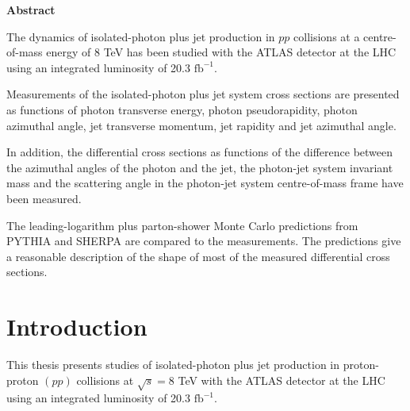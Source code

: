 \documentclass[12pt, twoside]{article}
\numberwithin{equation}{section}
\numberwithin{figure}{section}
\begin{document}
\newpage
\phantom{ }

\newpage
\vspace*{0.4cm}

\begin{center}
    \textbf{Abstract}
\end{center}

\vspace{1.5cm}
The dynamics of isolated-photon plus jet production in $pp$ collisions at a centre-of-mass energy of 8 TeV has been studied with the ATLAS detector at the LHC using an integrated luminosity of 20.3 $\text{fb}^{-1}$.

Measurements of the isolated-photon plus jet system cross sections are presented as functions of photon transverse energy, photon pseudorapidity, photon azimuthal angle, jet transverse momentum, jet rapidity and jet azimuthal angle.

In addition, the differential cross sections as functions of the difference between the azimuthal angles of the photon and the jet, the photon-jet system invariant mass and the scattering angle in the photon-jet system centre-of-mass frame have been measured.

The leading-logarithm plus parton-shower Monte Carlo predictions from PYTHIA and SHERPA are compared to the measurements. The predictions give a reasonable description of the shape of most of the measured differential cross sections.

\newpage
\tableofcontents

%
%
\newpage
\pagestyle{fancy}
\renewcommand{\sectionmark}[1]{\markboth{\uppercase{#1}}{}}
\renewcommand{\subsectionmark}[1]{\markright{#1}{}}
\fancyhf{}
\fancyhead[LO,RE]{\thepage}
\fancyhead[LE]{\textit{\nouppercase{\rightmark}}}
\fancyhead[RO]{\textit{\leftmark}}

\thispagestyle{empty}
\setcounter{page}{1}
\section{Introduction}
\label{sec:Introduction}
\vspace{1.0cm}

This thesis presents studies of isolated-photon plus jet production in proton-proton $(pp)$ collisions at $\sqrt{s} = 8$ TeV with the ATLAS detector at the LHC using an integrated luminosity of 20.3 $\text{fb}^{-1}$.
\end{document}
